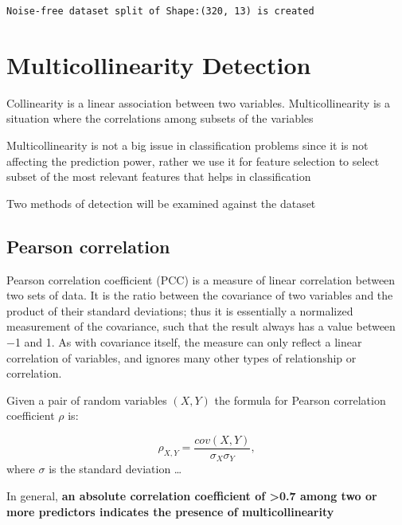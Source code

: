 \documentclass[11pt]{article}
\begin{document}
    \begin{Verbatim}[commandchars=\\\{\}]
Noise-free dataset split of Shape:(320, 13) is created
    \end{Verbatim}

    \hypertarget{multicollinearity-detection}{%
\section{Multicollinearity
Detection}\label{multicollinearity-detection}}

    Collinearity is a linear association between two variables.
Multicollinearity is a situation where the correlations among subsets of
the variables

Multicollinearity is not a big issue in classification problems since it
is not affecting the prediction power, rather we use it for feature
selection to select subset of the most relevant features that helps in
classification

Two methods of detection will be examined against the dataset

\hypertarget{pearson-correlation}{%
\subsection{Pearson correlation}\label{pearson-correlation}}

Pearson correlation coefficient (PCC) is a measure of linear correlation
between two sets of data. It is the ratio between the covariance of two
variables and the product of their standard deviations; thus it is
essentially a normalized measurement of the covariance, such that the
result always has a value between −1 and 1. As with covariance itself,
the measure can only reflect a linear correlation of variables, and
ignores many other types of relationship or correlation.

Given a pair of random variables \((X,Y)\) the formula for Pearson
correlation coefficient \(\rho\) is:

\begin{equation}
\label{eq:dotp}
\rho_{X,Y} = \frac {cov(X,Y)} {\sigma_X \sigma_Y}, 
\end{equation} where \(\sigma\) is the standard deviation \ldots{}

In general, \textbf{an absolute correlation coefficient of
\textgreater0.7 among two or more predictors indicates the presence of
multicollinearity}
\end{document}

